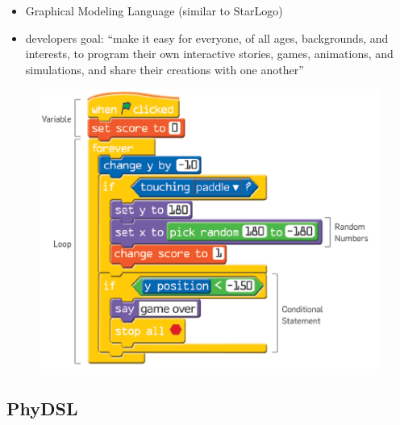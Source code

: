 \documentclass[runningheads,a4paper]{llncs}
\begin{document}
  \begin{itemize}
  \item Graphical Modeling Language (similar to StarLogo)
  \item developers goal: ``make it easy for everyone,
of all ages, backgrounds, and interests, to program
their own interactive stories, games, animations, and
simulations, and share their creations with one another''
  \end{itemize}
    \begin{figure}[ht]
      \centering
      \includegraphics[width=\textwidth]{images/Snatch1.PNG}
    \end{figure}
  
  
  \subsection{PhyDSL}
\end{document}
